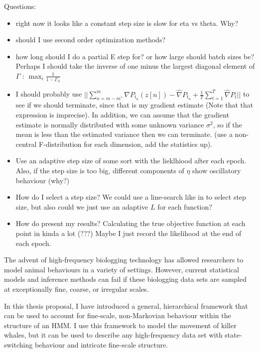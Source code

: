 
Questions:

\begin{itemize}
    \item right now it looks like a constant step size is slow for eta vs theta. Why?
    \item should I use second order optimization methods?
    \item how long should I do a partial E step for? or how large should batch sizes be? Perhaps I should take the inverse of one minus the largest diagonal element of $\Gamma$ : $\max_i \frac{1}{1-\Gamma_{ii}}$
    \item I should probably use $||\sum_{n=m-m^*}^{m} \nabla P_{t_n}(z[n]) - \widehat \nabla P_{t_n} + \frac{1}{T} \sum_{t=1}^T \widehat \nabla P_t||$ to see if we should terminate, since that is my gradient estimate (Note that that expression is imprecise). In addition, we can assume that the gradient estimate is normally distributed with some unknown variance $\sigma^2$, so if the mean is less than the estimated variance then we can terminate. (use a non-central F-distribution for each dimension, add the statistics up).
    \item Use an adaptive step size of some sort with the lieklhiood after each epoch. Also, if the step size is too big, different components of $\eta$ show oscillatory behaviour (why?)
    \item How do I select a step size? We could use a line-search like in \citep{Schmidt:2017} to select step size, but also could we just use an adaptive $L$ for each function?  
    \item How do present my results? Calculating the true objective function at each point in kinda a lot (???) Maybe I just record the likelihood at the end of each epoch.
\end{itemize}

\iffalse
The advent of high-frequency biologging technology has allowed researchers to model animal behaviours in a variety of settings. However, current statistical models and inference methods can fail if these biologging data sets are sampled at exceptionally fine, coarse, or irregular scales.

In this thesis proposal, I have introduced a general, hierarchical framework that can be used to account for fine-scale, non-Markovian behaviour within the structure of an HMM. I use this framework to model the movement of killer whales, but it can be used to describe any high-frequency data set with state-switching behaviour and intricate fine-scale structure. 

